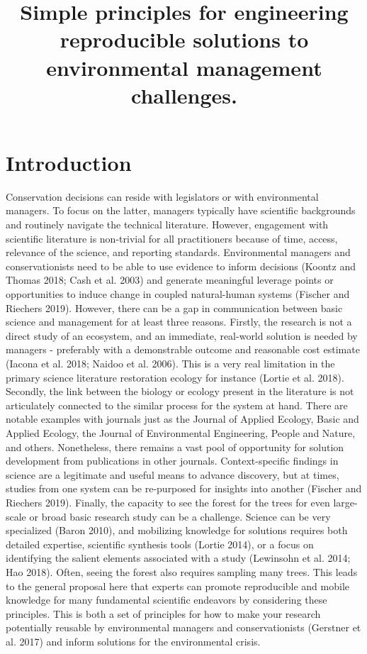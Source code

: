 \documentclass[fleqn,10pt]{wlpeerj} %
\title{Simple principles for engineering reproducible solutions to
environmental management challenges.}
\author[]{}
\begin{document}
\flushbottom
\maketitle
\thispagestyle{empty}

\hypertarget{introduction}{%
\section*{Introduction}\label{introduction}}

Conservation decisions can reside with legislators or with environmental
managers. To focus on the latter, managers typically have scientific
backgrounds and routinely navigate the technical literature. However,
engagement with scientific literature is non-trivial for all
practitioners because of time, access, relevance of the science, and
reporting standards. Environmental managers and conservationists need to
be able to use evidence to inform decisions (Koontz and Thomas 2018;
Cash et al. 2003) and generate meaningful leverage points or
opportunities to induce change in coupled natural-human systems (Fischer
and Riechers 2019). However, there can be a gap in communication between
basic science and management for at least three reasons. Firstly, the
research is not a direct study of an ecosystem, and an immediate,
real-world solution is needed by managers - preferably with a
demonstrable outcome and reasonable cost estimate (Iacona et al. 2018;
Naidoo et al. 2006). This is a very real limitation in the primary
science literature restoration ecology for instance (Lortie et al.
2018). Secondly, the link between the biology or ecology present in the
literature is not articulately connected to the similar process for the
system at hand. There are notable examples with journals just as the
Journal of Applied Ecology, Basic and Applied Ecology, the Journal of
Environmental Engineering, People and Nature, and others. Nonetheless,
there remains a vast pool of opportunity for solution development from
publications in other journals. Context-specific findings in science are
a legitimate and useful means to advance discovery, but at times,
studies from one system can be re-purposed for insights into another
(Fischer and Riechers 2019). Finally, the capacity to see the forest for
the trees for even large-scale or broad basic research study can be a
challenge. Science can be very specialized (Baron 2010), and mobilizing
knowledge for solutions requires both detailed expertise, scientific
synthesis tools (Lortie 2014), or a focus on identifying the salient
elements associated with a study (Lewinsohn et al. 2014; Hao 2018).
Often, seeing the forest also requires sampling many trees. This leads
to the general proposal here that experts can promote reproducible and
mobile knowledge for many fundamental scientific endeavors by
considering these principles. This is both a set of principles for how
to make your research potentially reusable by environmental managers and
conservationists (Gerstner et al. 2017) and inform solutions for the
environmental crisis.
\end{document}
